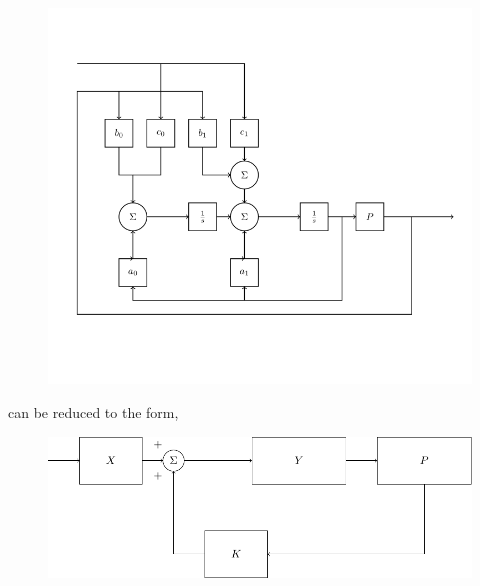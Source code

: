\documentclass[journal]{IEEEtran}
\begin{document}
\begin{enumerate}
		\begin{figure}[H]
			\centering
			\includegraphics[scale=0.5]{figs/fig39(1).png}
			\label{stemplot}
		\end{figure}
		can be reduced to the form,
\begin{figure}[H]
			\centering
			\includegraphics[scale=0.75]{figs/fig39(2).png}
			\label{stemplot}
		\end{figure}


\end{enumerate}
\end{document}
